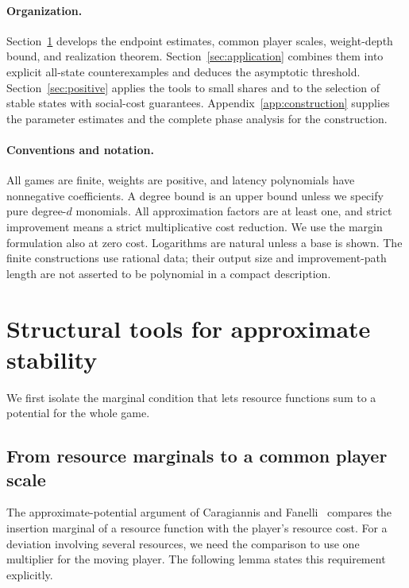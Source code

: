 \documentclass[manuscript,review,anonymous]{acmart}
\begin{document}
\paragraph{Organization.}
Section~\ref{sec:tools} develops the endpoint estimates, common player scales, weight-depth bound, and realization theorem. Section~\ref{sec:application} combines them into explicit all-state counterexamples and deduces the asymptotic threshold. Section~\ref{sec:positive} applies the tools to small shares and to the selection of stable states with social-cost guarantees. Appendix~\ref{app:construction} supplies the parameter estimates and the complete phase analysis for the construction.

\paragraph{Conventions and notation.}
All games are finite, weights are positive, and latency polynomials have nonnegative coefficients. A degree bound is an upper bound unless we specify pure degree-$d$ monomials. All approximation factors are at least one, and strict improvement means a strict multiplicative cost reduction. We use the margin formulation also at zero cost. Logarithms are natural unless a base is shown. The finite constructions use rational data; their output size and improvement-path length are not asserted to be polynomial in a compact description.

\section{Structural tools for approximate stability}\label{sec:tools}
We first isolate the marginal condition that lets resource functions sum to a potential for the whole game.

\subsection{From resource marginals to a common player scale}
The approximate-potential argument of Caragiannis and Fanelli~\cite{CF2021} compares the insertion marginal of a resource function with the player's resource cost. For a deviation involving several resources, we need the comparison to use one multiplier for the moving player. The following lemma states this requirement explicitly.
\end{document}
